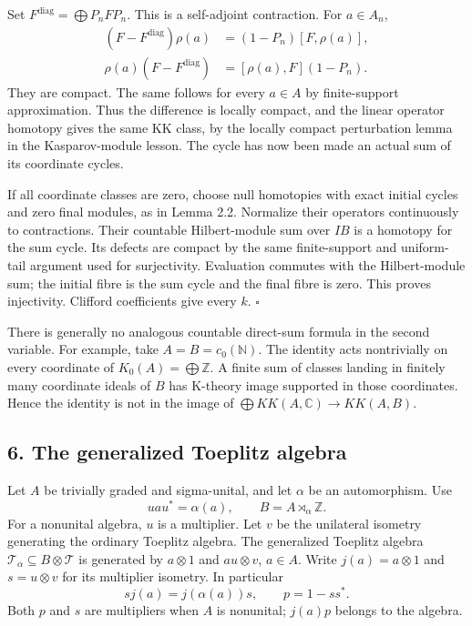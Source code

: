 \documentclass[
  11pt,
]{article}
\begin{document}
Set \(F^{\mathrm{diag}}=\bigoplus P_nF P_n\). This is a self-adjoint
contraction. For \(a\in A_n\), \[
\begin{aligned}
(F-F^{\mathrm{diag}})\rho(a)
&=(1-P_n)[F,\rho(a)],\\
\rho(a)(F-F^{\mathrm{diag}})
&=[\rho(a),F](1-P_n).
\end{aligned}
\tag{5.2}
\] They are compact. The same follows for every \(a\in A\) by
finite-support approximation. Thus the difference is locally compact,
and the linear operator homotopy gives the same KK class, by the locally
compact perturbation lemma in the Kasparov-module lesson. The cycle has
now been made an actual sum of its coordinate cycles.

If all coordinate classes are zero, choose null homotopies with exact
initial cycles and zero final modules, as in Lemma 2.2. Normalize their
operators continuously to contractions. Their countable Hilbert-module
sum over \(IB\) is a homotopy for the sum cycle. Its defects are compact
by the same finite-support and uniform-tail argument used for
surjectivity. Evaluation commutes with the Hilbert-module sum; the
initial fibre is the sum cycle and the final fibre is zero. This proves
injectivity. Clifford coefficients give every \(k\). \(\square\)

There is generally no analogous countable direct-sum formula in the
second variable. For example, take \(A=B=c_0(\mathbb N)\). The identity
acts nontrivially on every coordinate of \(K_0(A)=\bigoplus\mathbb Z\).
A finite sum of classes landing in finitely many coordinate ideals of
\(B\) has K-theory image supported in those coordinates. Hence the
identity is not in the image of
\(\bigoplus KK(A,\mathbb C)\to KK(A,B)\).

\subsection{6. The generalized Toeplitz
algebra}\label{the-generalized-toeplitz-algebra}

Let \(A\) be trivially graded and sigma-unital, and let \(\alpha\) be an
automorphism. Use \[
uau^*=\alpha(a),\qquad B=A\rtimes_\alpha\mathbb Z.
\tag{6.1}
\] For a nonunital algebra, \(u\) is a multiplier. Let \(v\) be the
unilateral isometry generating the ordinary Toeplitz algebra. The
generalized Toeplitz algebra
\(\mathcal T_\alpha\subseteq B\otimes\mathcal T\) is generated by
\(a\otimes1\) and \(au\otimes v\), \(a\in A\). Write \(j(a)=a\otimes1\)
and \(s=u\otimes v\) for its multiplier isometry. In particular \[
s j(a)=j(\alpha(a))s,\qquad p=1-ss^*.
\tag{6.2}
\] Both \(p\) and \(s\) are multipliers when \(A\) is nonunital;
\(j(a)p\) belongs to the algebra.
\end{document}
